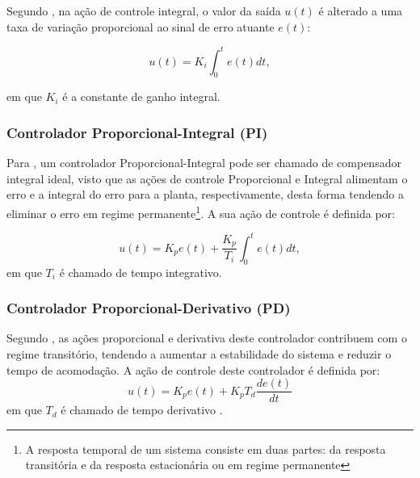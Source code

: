 Segundo , na ação de controle integral, o valor da saída $u(t)$ é alterado a uma taxa de variação proporcional 
ao sinal de erro atuante $e(t)$:

\begin{equation}
 u(t) = K_i \int_{0}^{t}e(t)dt,
\end{equation}

em que $K_i$ é a constante de ganho integral. 

\subsubsection{Controlador Proporcional-Integral (PI)}

Para , um controlador Proporcional-Integral pode ser chamado de compensador integral ideal, visto que 
as ações de controle Proporcional e Integral alimentam o erro e a integral do erro para a planta, respectivamente, desta forma 
tendendo a eliminar o erro em regime permanente\footnote{A resposta temporal de um sistema consiste em duas 
partes: da resposta transitória e da resposta estacionária ou em regime permanente}. 
A sua ação de controle é definida por: 

\begin{equation}
 u(t) = K_pe(t) + \frac{K_p}{T_i}\int_{0}^{t}e(t)dt,
\end{equation}
em que $T_i$ é chamado de tempo integrativo. 


\subsubsection{Controlador Proporcional-Derivativo (PD)}


Segundo , as ações proporcional e derivativa deste controlador 
contribuem com o regime transitório, %
tendendo a aumentar a estabilidade do sistema e reduzir o tempo de acomodação. 
A ação de controle deste controlador é definida por:
\begin{equation}
 u(t) = K_pe(t) + K_pT_d\frac{de(t)}{dt}
\end{equation}
em que $T_d$ é chamado de tempo derivativo \cite{ogata}.


